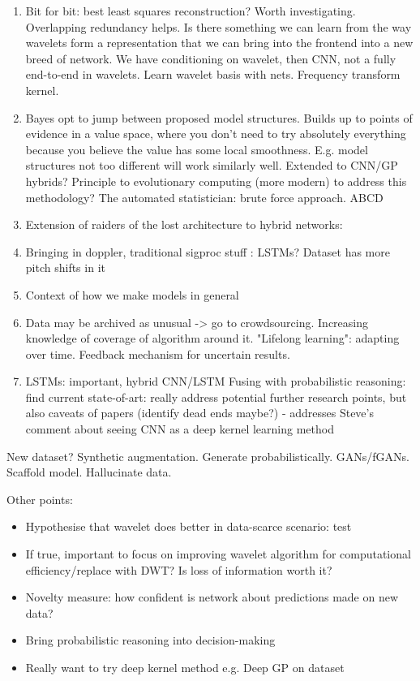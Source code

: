\documentclass[12pt]{llncs}
\begin{document}
\begin{enumerate}
	\item Bit for bit: best least squares reconstruction? Worth investigating. Overlapping redundancy helps. Is there something we can learn from the way wavelets form a representation that we can bring into the frontend into a new breed of network. We have conditioning on wavelet, then CNN, not a fully end-to-end in wavelets. Learn wavelet basis with nets. Frequency transform kernel. 
	\item Bayes opt to jump between proposed model structures. Builds up to points of evidence in a value space, where you don't need to try absolutely everything because you believe the value has some local smoothness. E.g. model structures not too different will work similarly well. Extended to CNN/GP hybrids? Principle to evolutionary computing (more modern) to address this methodology? The automated statistician: brute force approach. ABCD
	\item Extension of raiders of the lost architecture to hybrid networks: 
	\item Bringing in doppler, traditional sigproc stuff : LSTMs? Dataset has more pitch shifts in it
	\item Context of how we make models in general
	\item Data may be archived as unusual -> go to crowdsourcing. Increasing knowledge of coverage of algorithm around it. "Lifelong learning": adapting over time. Feedback mechanism for uncertain results. 
	\item LSTMs: important, hybrid CNN/LSTM
Fusing with probabilistic reasoning: find current state-of-art: really address potential further research points, but also caveats of papers (identify dead ends maybe?)
- addresses Steve's comment about seeing CNN as a deep kernel learning method

\end{enumerate}
New dataset? Synthetic augmentation. Generate probabilistically. GANs/fGANs. Scaffold model. Hallucinate data.



Other points:
\begin{itemize}
	\item Hypothesise that wavelet does better in data-scarce scenario: test
	\item If true, important to focus on improving wavelet algorithm for computational efficiency/replace with DWT? Is loss of information worth it?
	\item Novelty measure: how confident is network about predictions made on new data?
	\item Bring probabilistic reasoning into decision-making
	\item Really want to try deep kernel method e.g. Deep GP on dataset 
\end{itemize}
\end{document}
